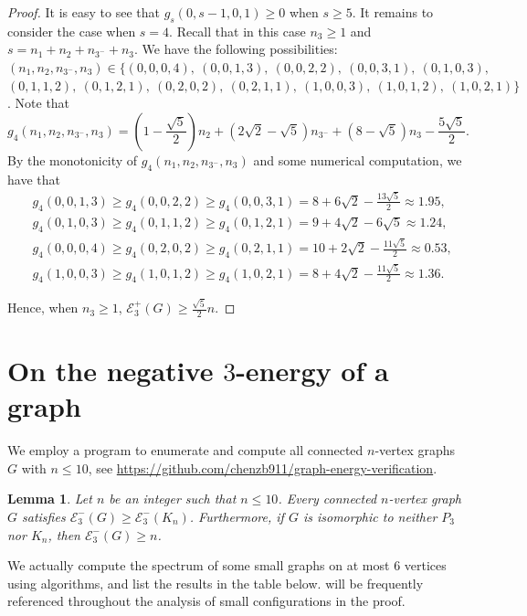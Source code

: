 \documentclass[a4paper,12pt]{article}
\theoremstyle{plain}
\newtheorem{lemma}[thm]{Lemma}
\begin{document}
\begin{proof}
It is easy to see that $g_s(0, s-1, 0, 1) \ge 0$ when $s \ge 5$. It remains to consider the case when $s=4$. Recall that in this case $n_3\geq 1$ and $s = n_1 + n_2 + n_{3^-} + n_3$. We have the following possibilities: $(n_1,n_2,n_{3^-},n_3) \in \{ (0,0,0,4),~(0,0,1,3),~(0,0,2,2),~(0,0,3,1),~(0,1,0,3),$\\ $(0,1,1,2),~
(0,1,2,1),~(0,2,0,2),~(0,2,1,1),~(1,0,0,3),~(1,0,1,2),~(1,0,2,1)\}$. Note that $$g_4(n_1,n_2,n_{3^-},n_3)=\left(1 - \frac{\sqrt{5}}{2}\right) n_2 + \left(2\sqrt{2} - \sqrt{5}\right) n_{3^-} + \left(8 - \sqrt{5}\right) n_3 - \frac{5\sqrt{5}}{2}.$$ By the monotonicity of $g_4(n_1,n_2,n_{3^-},n_3)$ and some numerical computation, we have that $$ 
\begin{aligned}
&g_4(0,0,1,3)\geq g_4(0,0,2,2)\geq g_4(0,0,3,1)=8 + 6\sqrt{2} - \frac{13\sqrt{5}}{2}\approx 1.95,\\
&g_4(0,1,0,3)\geq g_4(0,1,1,2)\geq g_4(0,1,2,1)=9 + 4\sqrt{2} - 6\sqrt{5}\approx 1.24,\\
&g_4(0,0,0,4)\geq g_4(0,2,0,2)\geq g_4(0,2,1,1)=10+2\sqrt{2} - \frac{11\sqrt{5}}{2}\approx0.53,\\
&g_4(1,0,0,3)\geq g_4(1,0,1,2)\geq g_4(1,0,2,1)=8 + 4\sqrt{2} - \frac{11\sqrt{5}}{2}\approx1.36.
\end{aligned}$$

Hence, when $n_3\geq 1$, $\mathcal{E}^+_3(G) \geq \frac{\sqrt{5}}{2} n$.
\end{proof}





\section[negative]{On the negative $3$-energy of a graph}\label{sec:negative-energy}

We employ a program to enumerate and compute all connected $n$-vertex graphs $G$ with $n \leq 10$, see \href{https://github.com/chenzb911/graph-energy-verification}{https://github.com/chenzb911/graph-energy-verification}.


\begin{lemma}\label{lem:UpToTenV}
Let $n$ be an integer such that $n\leq 10$. Every connected $n$-vertex graph $G$ satisfies $\mathcal{E}_3^-(G)\geq \mathcal{E}_3^-(K_n)$. Furthermore, if $G$ is isomorphic to neither $P_3$ nor $K_n$, then $\mathcal{E}_3^-(G)\geq n$.
\end{lemma}


We actually compute the spectrum of some small graphs on at most $6$ vertices using algorithms, and list the results in the table below.  will be frequently referenced throughout the analysis of small configurations in the proof.
\end{document}
